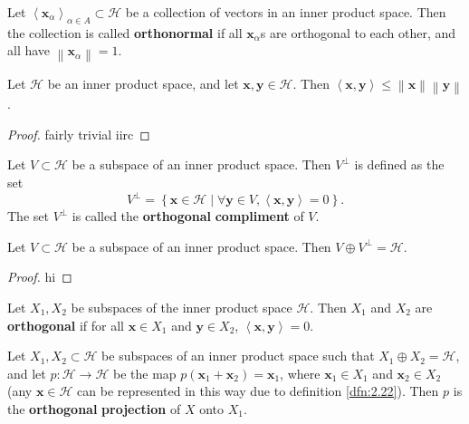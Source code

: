 \documentclass[11pt, letterpaper]{report}
\begin{document}
\begin{definition}[Orthonormal]\label{dfn:2.35}
	Let $\left\langle \mathbf{x}_\alpha  \right\rangle_{\alpha \in A}\subset \mathcal{H} $ be a collection of vectors in an inner product space. Then the collection is called \textbf{orthonormal} if all $\mathbf{x}_\alpha $s are orthogonal to each other, and all have $\left\lVert \mathbf{x}_\alpha  \right\rVert =1$.
\end{definition}
\begin{proposition}\label{prp:2.7}
	Let $\mathcal{H} $ be an inner product space, and let $\mathbf{x},\mathbf{y}\in \mathcal{H} $. Then $\left\langle \mathbf{x},\mathbf{y} \right\rangle \leq \left\lVert \mathbf{x} \right\rVert \left\lVert \mathbf{y} \right\rVert $.
\end{proposition}
\begin{proof}
	fairly trivial iirc
\end{proof}
\begin{definition}\label{dfn:2.36}
	Let $V\subset \mathcal{H} $ be a subspace of an inner product space. Then $V^\perp$ is defined as the set
	\[
		V^\perp = \left\{ \mathbf{x}\in \mathcal{H}  \mid \forall \mathbf{y}\in V,\left\langle \mathbf{x},\mathbf{y} \right\rangle =0 \right\} 
	.\]
	The set $V^\perp $ is called the \textbf{orthogonal} \textbf{compliment} of $V$.
\end{definition}
\begin{theorem}\label{thm:2.10}
	Let $V\subset \mathcal{H} $ be a subspace of an inner product space. Then $V\oplus V^\perp =\mathcal{H} $.
\end{theorem}
\begin{proof}
	hi
\end{proof}
\begin{definition}\label{dfn:2.37}
	Let $X_1,X_2$ be subspaces of the inner product space $\mathcal{H} $. Then $X_1$ and $X_2$ are \textbf{orthogonal} if for all $\mathbf{x}\in X_1$ and $\mathbf{y}\in X_2$, $\left\langle \mathbf{x},\mathbf{y} \right\rangle =0$.
\end{definition}
\begin{definition}\label{dfn:2.38}
	 Let $X_1,X_2\subset \mathcal{H} $ be subspaces of an inner product space such that $X_1\oplus X_2=\mathcal{H} $, and let $p : \mathcal{H}  \to \mathcal{H} $ be the map $p(\mathbf{x}_1+\mathbf{x}_2)=\mathbf{x}_1$, where $\mathbf{x}_1\in X_1$ and $\mathbf{x}_2\in X_2$ (any $\mathbf{x}\in \mathcal{H} $ can be represented in this way due to definition \ref{dfn:2.22}). Then $p$ is the \textbf{orthogonal} \textbf{projection} of $X$ onto $X_1$.
\end{definition}
\end{document}
